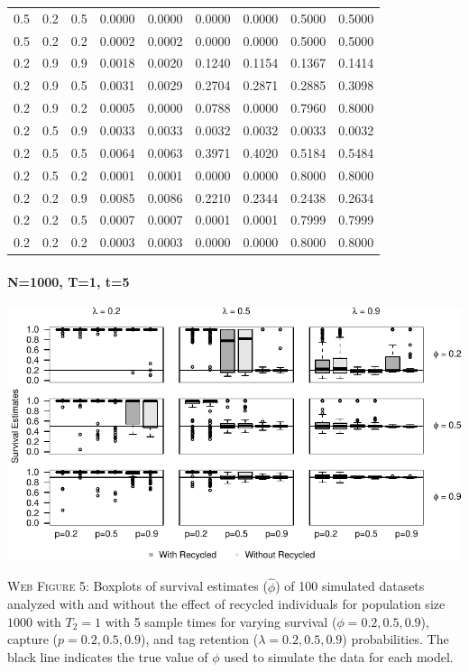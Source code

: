 \documentclass[]{article}
\let\oldparagraph\paragraph
\renewcommand{\paragraph}[1]{\oldparagraph{#1}\mbox{}}
\begin{document}
\begin{table}[ht]
{\begin{tabular}{rrrrrrrrr}
  0.5 & 0.2 & 0.5 & 0.0000 & 0.0000 & 0.0000 & 0.0000 & 0.5000 & 0.5000 \\ 
  0.5 & 0.2 & 0.2 & 0.0002 & 0.0002 & 0.0000 & 0.0000 & 0.5000 & 0.5000 \\ 
  0.2 & 0.9 & 0.9 & 0.0018 & 0.0020 & 0.1240 & 0.1154 & 0.1367 & 0.1414 \\ 
  0.2 & 0.9 & 0.5 & 0.0031 & 0.0029 & 0.2704 & 0.2871 & 0.2885 & 0.3098 \\ 
  0.2 & 0.9 & 0.2 & 0.0005 & 0.0000 & 0.0788 & 0.0000 & 0.7960 & 0.8000 \\ 
  0.2 & 0.5 & 0.9 & 0.0033 & 0.0033 & 0.0032 & 0.0032 & 0.0033 & 0.0032 \\ 
  0.2 & 0.5 & 0.5 & 0.0064 & 0.0063 & 0.3971 & 0.4020 & 0.5184 & 0.5484 \\ 
  0.2 & 0.5 & 0.2 & 0.0001 & 0.0001 & 0.0000 & 0.0000 & 0.8000 & 0.8000 \\ 
  0.2 & 0.2 & 0.9 & 0.0085 & 0.0086 & 0.2210 & 0.2344 & 0.2438 & 0.2634 \\ 
  0.2 & 0.2 & 0.5 & 0.0007 & 0.0007 & 0.0001 & 0.0001 & 0.7999 & 0.7999 \\ 
  0.2 & 0.2 & 0.2 & 0.0003 & 0.0003 & 0.0000 & 0.0000 & 0.8000 & 0.8000 \\ 
   \hline
\end{tabular}
}
\endgroup
\end{table}

\newpage

\paragraph{N=1000, T=1, t=5}\label{n1000-t1-t5}

\includegraphics{Appendix_BW_files/figure-latex/figure5_survival_GJSTL5-1.pdf}

\textsc{Web Figure 5:} Boxplots of survival estimates (\(\hat{\phi}\))
of 100 simulated datasets analyzed with and without the effect of
recycled individuals for population size \(1000\) with \(T_2=1\) with 5
sample times for varying survival (\(\phi=0.2,0.5,0.9\)), capture
(\(p=0.2,0.5,0.9\)), and tag retention (\(\lambda=0.2,0.5,0.9\))
probabilities. The black line indicates the true value of \(\phi\) used
to simulate the data for each model.
\end{document}
